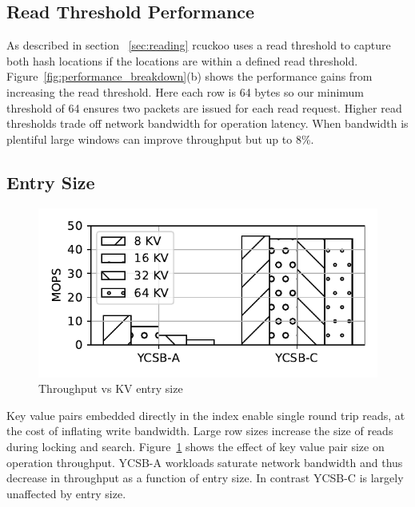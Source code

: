 \subsection{Read Threshold Performance}



As described in section ~\ref{sec:reading} rcuckoo uses a
read threshold to capture both hash locations if the
locations are within a defined read threshold.
Figure~\ref{fig:performance_breakdown}(b) shows the performance gains
from increasing the read threshold. Here each row is 64
bytes so our minimum threshold of 64 ensures two packets are
issued for each read request. Higher read thresholds trade
off network bandwidth for operation latency. When bandwidth
is plentiful large windows can improve throughput but up to
8\%.



\subsection{Entry Size}
\begin{figure}[ht]
    \includegraphics[width=0.99\linewidth]{fig/entry_size.pdf}
    \caption{Throughput vs KV entry size}
    \label{fig:entry_size}
\end{figure}

Key value pairs embedded directly in the index enable single
round trip reads, at the cost of inflating write bandwidth.
Large row sizes increase the size of reads during locking
and search. Figure~\ref{fig:entry_size} shows the effect of
key value pair size on operation throughput. YCSB-A
workloads saturate network bandwidth and thus decrease in
throughput as a function of entry size. In contrast YCSB-C
is largely unaffected by entry size. 



